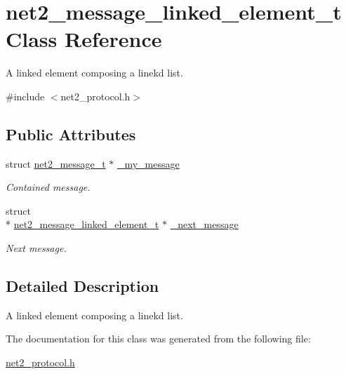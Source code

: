 \hypertarget{structnet2__message__linked__element__t}{\section{net2\-\_\-message\-\_\-linked\-\_\-element\-\_\-t Class Reference}
\label{structnet2__message__linked__element__t}
}


A linked element composing a linekd list.  




{\ttfamily \#include $<$net2\-\_\-protocol.\-h$>$}

\subsection*{Public Attributes}
\begin{DoxyCompactItemize}
\item 
\hypertarget{structnet2__message__linked__element__t_a6ef66e03a7c837615a5fc44d05e10da9}{struct \hyperlink{structnet2__message__t}{net2\-\_\-message\-\_\-t} $\ast$ \hyperlink{structnet2__message__linked__element__t_a6ef66e03a7c837615a5fc44d05e10da9}{\-\_\-my\-\_\-message}}\label{structnet2__message__linked__element__t_a6ef66e03a7c837615a5fc44d05e10da9}

\begin{DoxyCompactList}\small\item\em Contained message. \end{DoxyCompactList}\item 
\hypertarget{structnet2__message__linked__element__t_a4456c5695189635ab7db61a66a706e03}{struct \\*
\hyperlink{structnet2__message__linked__element__t}{net2\-\_\-message\-\_\-linked\-\_\-element\-\_\-t} $\ast$ \hyperlink{structnet2__message__linked__element__t_a4456c5695189635ab7db61a66a706e03}{\-\_\-next\-\_\-message}}\label{structnet2__message__linked__element__t_a4456c5695189635ab7db61a66a706e03}

\begin{DoxyCompactList}\small\item\em Next message. \end{DoxyCompactList}\end{DoxyCompactItemize}


\subsection{Detailed Description}
A linked element composing a linekd list. 

The documentation for this class was generated from the following file\-:\begin{DoxyCompactItemize}
\item 
\hyperlink{net2__protocol_8h}{net2\-\_\-protocol.\-h}\end{DoxyCompactItemize}
